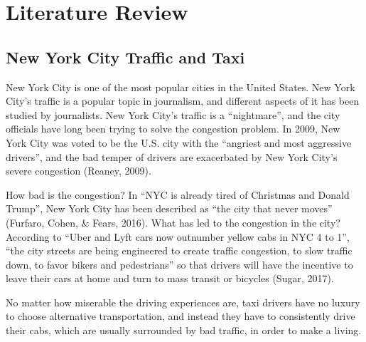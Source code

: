 \documentclass[12pt,twoside]{reedthesis}
\theoremstyle{definition}
\theoremstyle{definition}
\theoremstyle{definition}
\theoremstyle{remark}
\begin{document}
\section{Literature Review}\label{literature-review}

\subsection{New York City Traffic and
Taxi}\label{new-york-city-traffic-and-taxi}

New York City is one of the most popular cities in the United States.
New York City's traffic is a popular topic in journalism, and different
aspects of it has been studied by journalists. New York City's traffic
is a ``nightmare'', and the city officials have long been trying to
solve the congestion problem. In 2009, New York City was voted to be the
U.S. city with the ``angriest and most aggressive drivers'', and the bad
temper of drivers are exacerbated by New York City's severe congestion
(Reaney, 2009).

How bad is the congestion? In ``NYC is already tired of Christmas and
Donald Trump'', New York City has been described as ``the city that
never moves'' (Furfaro, Cohen, \& Fears, 2016). What has led to the
congestion in the city? According to ``Uber and Lyft cars now outnumber
yellow cabs in NYC 4 to 1'', ``the city streets are being engineered to
create traffic congestion, to slow traffic down, to favor bikers and
pedestrians'' so that drivers will have the incentive to leave their
cars at home and turn to mass transit or bicycles (Sugar, 2017).

No matter how miserable the driving experiences are, taxi drivers have
no luxury to choose alternative transportation, and instead they have to
consistently drive their cabs, which are usually surrounded by bad
traffic, in order to make a living.
\end{document}
